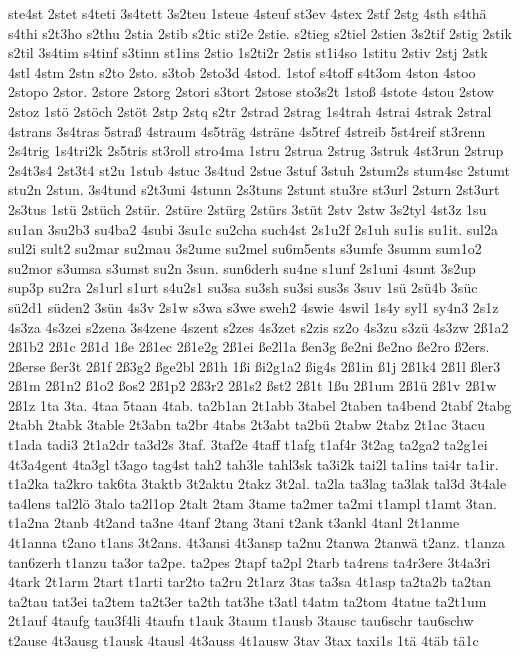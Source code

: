{ste4st
2stet
s4teti
3s4tett
3s2teu
1steue
4steuf
st3ev
4stex
2stf
2stg
4sth
s4thä
s4thi
s2t3ho
s2thu
2stia
2stib
s2tic
sti2e
2stie.
s2tieg
s2tiel
2stien
3s2tif
2stig
2stik
s2til
3s4tim
s4tinf
s3tinn
st1ins
2stio
1s2ti2r
2stis
st1i4so
1stitu
2stiv
2stj
2stk
4stl
4stm
2stn
s2to
2sto.
s3tob
2sto3d
4stod.
1stof
s4toff
s4t3om
4ston
4stoo
2stopo
2stor.
2store
2storg
2stori
s3tort
2stose
sto3s2t
1stoß
4stote
4stou
2stow
2stoz
1stö
2stöch
2stöt
2stp
2stq
s2tr
2strad
2strag
1s4trah
4strai
4strak
2stral
4strans
3s4tras
5straß
4straum
4s5träg
4sträne
4s5tref
4streib
5st4reif
st3renn
2s4trig
1s4tri2k
2s5tris
st3roll
stro4ma
1stru
2strua
2strug
3struk
4st3run
2strup
2s4t3s4
2st3t4
st2u
1stub
4stuc
3s4tud
2stue
3stuf
3stuh
2stum2s
stum4sc
2stumt
stu2n
2stun.
3s4tund
s2t3uni
4stunn
2s3tuns
2stunt
stu3re
st3url
2sturn
2st3urt
2s3tus
1stü
2stüch
2stür.
2stüre
2stürg
2stürs
3stüt
2stv
2stw
3s2tyl
4st3z
1su
su1an
3su2b3
su4ba2
4subi
3su1c
su2cha
such4st
2s1u2f
2s1uh
su1is
su1it.
sul2a
sul2i
sult2
su2mar
su2mau
3s2ume
su2mel
su6m5ents
s3umfe
3summ
sum1o2
su2mor
s3umsa
s3umst
su2n
3sun.
sun6derh
su4ne
s1unf
2s1uni
4sunt
3s2up
sup3p
su2ra
2s1url
s1urt
s4u2s1
su3sa
su3sh
su3si
sus3s
3suv
1sü
2sü4b
3süc
sü2d1
süden2
3sün
4s3v
2s1w
s3wa
s3we
sweh2
4swie
4swil
1s4y
syl1
sy4n3
2s1z
4s3za
4s3zei
s2zena
3s4zene
4szent
s2zes
4s3zet
s2zis
sz2o
4s3zu
s3zü
4s3zw
2ß1a2
2ß1b2
2ß1c
2ß1d
1ße
2ß1ec
2ß1e2g
2ß1ei
ße2l1a
ßen3g
ße2ni
ße2no
ße2ro
ß2ers.
2ßerse
ßer3t
2ß1f
2ß3g2
ßge2bl
2ß1h
1ßi
ßi2g1a2
ßig4s
2ß1in
ß1j
2ß1k4
2ß1l
ßler3
2ß1m
2ß1n2
ß1o2
ßos2
2ß1p2
2ß3r2
2ß1s2
ßst2
2ß1t
1ßu
2ß1um
2ß1ü
2ß1v
2ß1w
2ß1z
1ta
3ta.
4taa
5taan
4tab.
ta2b1an
2t1abb
3tabel
2taben
ta4bend
2tabf
2tabg
2tabh
2tabk
3table
2t3abn
ta2br
4tabs
2t3abt
ta2bü
2tabw
2tabz
2t1ac
3tacu
t1ada
tadi3
2t1a2dr
ta3d2s
3taf.
3taf2e
4taff
t1afg
t1af4r
3t2ag
ta2ga2
ta2g1ei
4t3a4gent
4ta3gl
t3ago
tag4st
tah2
tah3le
tahl3sk
ta3i2k
tai2l
ta1ins
tai4r
ta1ir.
t1a2ka
ta2kro
tak6ta
3taktb
3t2aktu
2takz
3t2al.
ta2la
ta3lag
ta3lak
tal3d
3t4ale
ta4lens
tal2lö
3talo
ta2l1op
2talt
2tam
3tame
ta2mer
ta2mi
t1ampl
t1amt
3tan.
t1a2na
2tanb
4t2and
ta3ne
4tanf
2tang
3tani
t2ank
t3ankl
4tanl
2t1anme
4t1anna
t2ano
t1ans
3t2ans.
4t3ansi
4t3ansp
ta2nu
2tanwa
2tanwä
t2anz.
t1anza
tan6zerh
t1anzu
ta3or
ta2pe.
ta2pes
2tapf
ta2pl
2tarb
ta4rens
ta4r3ere
3t4a3ri
4tark
2t1arm
2tart
t1arti
tar2to
ta2ru
2t1arz
3tas
ta3sa
4t1asp
ta2ta2b
ta2tan
ta2tau
tat3ei
ta2tem
ta2t3er
ta2th
tat3he
t3atl
t4atm
ta2tom
4tatue
ta2t1um
2t1auf
4taufg
tau3f4li
4taufn
t1auk
3taum
t1ausb
3tausc
tau6schr
tau6schw
t2ause
4t3ausg
t1ausk
4tausl
4t3auss
4t1ausw
3tav
3tax
taxi1s
1tä
4täb
tä1c
}
